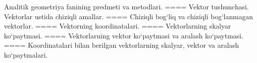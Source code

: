 Analitik geometriya fanining predmeti va metodlari.
====
Vektor tushunchasi. Vektorlar ustida chiziqli amallar.
====
Chiziqli bog‘liq va chiziqli bog‘lanmagan vektorlar.
====
Vektorning koordinatalari.
====
Vektorlarning skalyar ko‘paytmasi.
====
Vektorlarning vektor ko‘paytmasi va aralash ko‘paytmasi.
====
Koordinatalari bilan berilgan vektorlarning skalyar, vektor va aralash ko‘paytmalari.